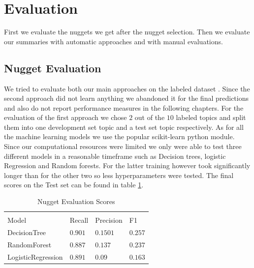 \documentclass{article}
\begin{document}
\section{Evaluation}
\label{sec:eval}

First we evaluate the nuggets we get after the nugget selection. Then we evaluate our summaries with automatic approaches and with manual evaluations.

\subsection{Nugget Evaluation}
We tried to evaluate both our main approaches on the labeled dataset \cite{Tauchmann.et.al.2018.LREC}. Since the second approach did not learn anything we abandoned it for the final predictions and also do not report performance measures in the following chapters. For the evaluation of the first approach we chose $2$ out of the $10$ labeled topics and split them into one development set topic and a test set topic respectively. As for all the machine learning models we use the popular scikit-learn python module. Since our computational resources were limited we only were able to test three different models in a reasonable timeframe such as Decision trees, logistic Regression and Random forests. For the latter training however took significantly longer than for the other two so less hyperparameters were tested.
The final scores on the Test set can be found in table \ref{Nugget_scores}.
\begin{table}
	\caption{Nugget Evaluation Scores}
	\label{Nugget_scores}
	\centering
	\begin{tabular}{llll}
		\toprule
		\multicolumn{4}{c}{}                   \\

		Model     & Recall & Precision & F1 \\
		\midrule
		DecisionTree & $0.901$  & $0.1501$ &   $0.257$   \\
		RandomForest     & $0.887$ & $0.137$ &   $0.237$   \\
		LogisticRegression     &  $0.891$ & $0.09$ & $0.163$  \\
		\bottomrule
	\end{tabular}
\end{table}
\end{document}
